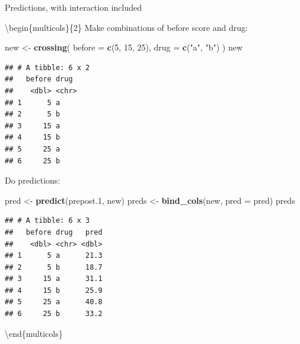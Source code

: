 \documentclass[ignorenonframetext,]{beamer}
\newenvironment{Shaded}{\begin{snugshade}}{\end{snugshade}}
\newcommand{\DataTypeTok}[1]{\textcolor[rgb]{0.13,0.29,0.53}{#1}}
\newcommand{\DecValTok}[1]{\textcolor[rgb]{0.00,0.00,0.81}{#1}}
\newcommand{\FloatTok}[1]{\textcolor[rgb]{0.00,0.00,0.81}{#1}}
\newcommand{\KeywordTok}[1]{\textcolor[rgb]{0.13,0.29,0.53}{\textbf{#1}}}
\newcommand{\NormalTok}[1]{#1}
\newcommand{\StringTok}[1]{\textcolor[rgb]{0.31,0.60,0.02}{#1}}
\begin{document}
\begin{frame}[fragile]{Predictions, with interaction included}
\protect\hypertarget{predictions-with-interaction-included}{}

\textbackslash{}begin\{multicols\}\{2\} Make combinations of before
score and drug:

\begin{Shaded}
\begin{Highlighting}[]
\NormalTok{new <-}\StringTok{ }\KeywordTok{crossing}\NormalTok{(}
  \DataTypeTok{before =} \KeywordTok{c}\NormalTok{(}\DecValTok{5}\NormalTok{, }\DecValTok{15}\NormalTok{, }\DecValTok{25}\NormalTok{),}
  \DataTypeTok{drug =} \KeywordTok{c}\NormalTok{(}\StringTok{"a"}\NormalTok{, }\StringTok{"b"}\NormalTok{)}
\NormalTok{)}
\NormalTok{new}
\end{Highlighting}
\end{Shaded}

\begin{verbatim}
## # A tibble: 6 x 2
##   before drug 
##    <dbl> <chr>
## 1      5 a    
## 2      5 b    
## 3     15 a    
## 4     15 b    
## 5     25 a    
## 6     25 b
\end{verbatim}

Do predictions:

\begin{Shaded}
\begin{Highlighting}[]
\NormalTok{pred <-}\StringTok{ }\KeywordTok{predict}\NormalTok{(prepost}\FloatTok{.1}\NormalTok{, new)}
\NormalTok{preds <-}\StringTok{ }\KeywordTok{bind_cols}\NormalTok{(new, }\DataTypeTok{pred =}\NormalTok{ pred)}
\NormalTok{preds}
\end{Highlighting}
\end{Shaded}

\begin{verbatim}
## # A tibble: 6 x 3
##   before drug   pred
##    <dbl> <chr> <dbl>
## 1      5 a      21.3
## 2      5 b      18.7
## 3     15 a      31.1
## 4     15 b      25.9
## 5     25 a      40.8
## 6     25 b      33.2
\end{verbatim}

\textbackslash{}end\{multicols\}

\end{frame}
\end{document}
